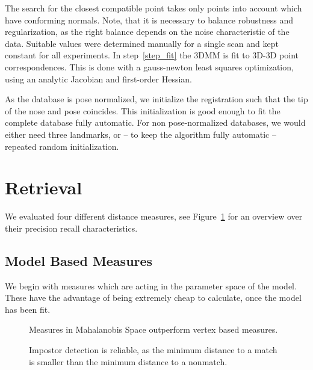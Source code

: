 \documentclass{vgtc}                          %
\begin{document}
The search for the closest compatible point takes only points into account which
have conforming normals. 
Note, that it is necessary to balance robustness and regularization, as the
right balance depends on the noise characteristic of the data. Suitable values
were determined manually for a single scan and kept constant for all
experiments.  In step~\ref{step_fit} the 3DMM is fit to 3D-3D point
correspondences.  This is done with a gauss-newton least squares optimization,
using an analytic Jacobian and first-order Hessian.

As the database is pose normalized, we initialize the registration such that
the tip of the nose and pose coincides. This initialization is good enough to
fit the complete database fully automatic. For non pose-normalized databases,
we would either need three landmarks, or -- to keep the algorithm fully
automatic -- repeated random initialization.

\section{Retrieval}
We evaluated four different distance measures, see Figure~\ref{fig:precision} for an overview over their precision recall characteristics.

\subsection{Model Based Measures}
We begin with measures which are acting in the parameter space of the model.
These have the advantage of being extremely cheap to calculate, once the model
has been fit.
\begin{figure}
  \hspace{2.5em}\scalebox{0.68}{}
  \vspace{-0.7em}
  \caption{Measures in Mahalanobis Space outperform vertex based measures.}
  \label{fig:precision}
\end{figure}
\begin{figure}
  \vspace{-1.0em}
  \hspace{2.5em}\scalebox{0.68}{}
  \vspace{0.1em}
  \caption{Impostor detection is reliable, as the minimum distance to a match is smaller than the minimum distance to a nonmatch.}
  \label{fig:impostor}
\end{figure}
\end{document}

